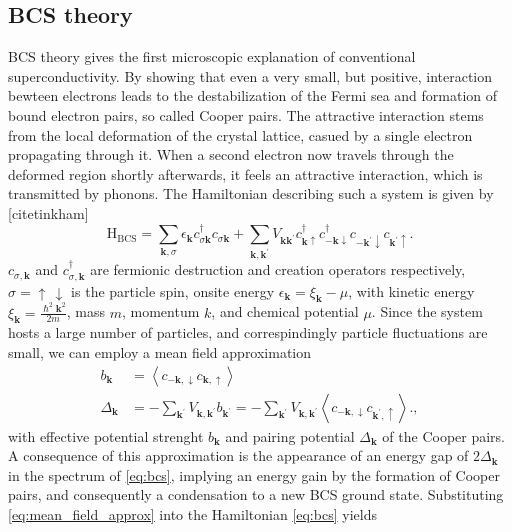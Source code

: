 \subsection{BCS theory}
\label{sec:BCS}
BCS theory gives the first microscopic explanation of conventional superconductivity. By showing that even a very small, but positive, interaction bewteen electrons leads to the destabilization of the Fermi sea and formation of bound electron pairs, so called Cooper pairs. The attractive interaction stems from the local deformation of the crystal lattice, casued by a single electron propagating through it. When a second electron now travels through the deformed region shortly afterwards, it feels an attractive interaction, which is transmitted by phonons. The Hamiltonian describing such a system is given by [cite{tinkham}]
\begin{equation}
	\mathrm{H}_\text{BCS} = \sum_{\mathbf{k},\sigma} \epsilon_\mathbf{k} c_{\sigma \mathbf{k}}^\dagger c_{\sigma \mathbf{k}}+ \sum_{\mathbf{k,k^\prime}} V_\mathbf{kk^\prime} c_{\mathbf{k}\uparrow}^\dagger c_{-\mathbf{k}\downarrow}^\dagger c_{-\mathbf{k^\prime}\downarrow}c_{\mathbf{k^\prime}\uparrow}.
	\label{eq:bcs}
\end{equation}
$c_{\sigma,\mathbf{k}}$ and $c_{\sigma, \mathbf{k}}^\dagger$ are fermionic destruction and creation operators respectively, $\sigma = \uparrow\,\downarrow$ is the particle spin, onsite energy $\epsilon_\mathbf{k} = \xi_\mathbf{k} - \mu$, with kinetic energy $\xi_{\mathbf{k}} = \frac{\hslash^2\mathbf{k}^2}{2m}$, mass $m$, momentum $k$, and chemical potential $\mu$. Since the system hosts a large number of particles, and correspindingly particle fluctuations are small, we can employ a mean field approximation  
\begin{equation}
	\begin{aligned}
		b_\mathbf{k} &= \left< c_{-\mathbf{k}, \downarrow} c_{\mathbf{k}, \uparrow} \right> \\
		\Delta_\mathbf{k} &= -\sum_\mathbf{k^\prime} V_\mathbf{k,k^\prime} b_\mathbf{k^\prime} = -\sum_\mathbf{k^\prime} V_\mathbf{k,k^\prime} \left< c_{-\mathbf{k}, \downarrow} c_{\mathbf{k^\prime}, \uparrow} \right>.
		\label{eq:mean_field_approx},
    \end{aligned}
\end{equation}
with effective potential strenght $b_\mathbf{k}$ and pairing potential $\Delta_\mathbf{k}$ of the Cooper pairs. A consequence of this approximation is the appearance of an energy gap of $2\Delta_\mathbf{k}$ in the spectrum of \eqref{eq:bcs}, implying an energy gain by the formation of Cooper pairs, and consequently a condensation to a new BCS ground state. Substituting \eqref{eq:mean_field_approx} into the Hamiltonian \eqref{eq:bcs} yields
